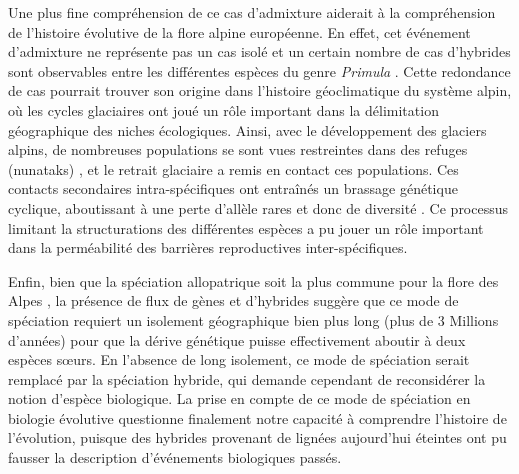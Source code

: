 Une plus fine compréhension de ce cas d'admixture aiderait à la compréhension de l'histoire évolutive de la flore alpine européenne. En effet, cet événement d'admixture ne représente pas un cas isolé et un certain nombre de cas d'hybrides sont observables entre les différentes espèces du genre \textit{Primula} \citep{Boucher2016a,Boucher2016,Schorr2012,Casazza2012,Kadereit2011}. Cette redondance de cas pourrait trouver son origine dans l'histoire géoclimatique du système alpin, où les cycles glaciaires ont joué un rôle important dans la délimitation géographique des niches écologiques. Ainsi, avec le développement des glaciers alpins, de nombreuses populations se sont vues restreintes dans des refuges (nunataks) \citep{Schneeweiss2011}, et le retrait glaciaire a remis en contact ces populations. Ces contacts secondaires intra-spécifiques ont entraînés un brassage génétique cyclique, aboutissant à une perte d'allèle rares et donc de diversité \citep{Schorr2012}. Ce processus limitant la structurations des différentes espèces a pu jouer un rôle important dans la perméabilité des barrières reproductives inter-spécifiques.

Enfin, bien que la spéciation allopatrique soit la plus commune pour la flore des Alpes \citep{Boucher2016}, la présence de flux de gènes et d'hybrides suggère que ce mode de spéciation requiert un isolement géographique bien plus long (plus de 3 Millions d'années) pour que la dérive génétique puisse effectivement aboutir à deux espèces sœurs. En l'absence de long isolement, ce mode de spéciation serait remplacé par la spéciation hybride, qui demande cependant de reconsidérer la notion d'espèce biologique. La prise en compte de ce mode de spéciation en biologie évolutive questionne finalement notre capacité à comprendre l'histoire de l'évolution, puisque des hybrides provenant de lignées aujourd'hui éteintes ont pu fausser la description d’événements biologiques passés.  


